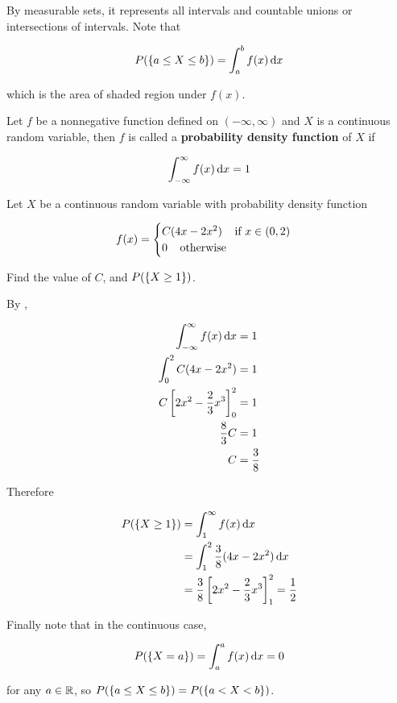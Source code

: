 \documentclass[a4paper,12pt]{article}
\begin{document}
By measurable sets, it represents all intervals and countable unions or intersections of intervals. Note that

$$P(\left\{ a\leq X\leq b\right\})=\int_{a}^{b}f(x)\,\mathrm{d} x$$\s

which is the area of shaded region under $f(x)$.\n

\begin{dft}
  Let $f$ be a nonnegative function defined on $(-\infty,\infty)$ and $X$ is a continuous random variable, then $f$ is called a \textbf{probability density function} of $X$ if

  $$\int_{-\infty}^{\infty}f(x)\,\mathrm{d} x=1$$
\end{dft}\n

\begin{exm}
  Let $X$ be a continuous random variable with probability density function

  $$f(x)=\begin{cases}
    C(4x-2x^2)\;\;\;\;\text{if }x\in(0,2)\\
    0\;\;\;\;\text{otherwise}
  \end{cases}$$\s

  Find the value of $C$, and $P(\left\{ X\geq 1\right\})$.\n
  
  \ans By \rdft[\sctd{1}],

  $$\begin{aligned}[t]
    \int_{-\infty}^{\infty}f(x)\,\mathrm{d} x&=1\\
    \int_{0}^{2}C(4x-2x^{2})&=1\\
    C\left[ 2x^{2}-\frac{2}{3}x^{3}\right]_{0}^{2}&=1\\
    \frac{8}{3}C&=1\\
    C&=\frac{3}{8}    
  \end{aligned}$$\s

  Therefore

  $$\begin{aligned}[t]
    P(\left\{ X\geq 1\right\})&=\int_{1}^{\infty}f(x)\,\mathrm{d} x\\
    &=\int_{1}^{2}\frac{3}{8}(4x-2x^{2})\,\mathrm{d} x\\
    &=\frac{3}{8}\left[ 2x^{2}-\frac{2}{3}x^{3}\right]_{1}^{2}=\frac{1}{2}
  \end{aligned}$$
\end{exm}\n

Finally note that in the continuous case,

$$P(\left\{ X=a\right\})=\int_{a}^{a}f(x)\,\mathrm{d} x=0$$\s

for any $a\in\mathbb{R}$, so $P(\left\{ a\leq X\leq b\right\})=P(\left\{ a<X<b\right\})$.
\end{document}
